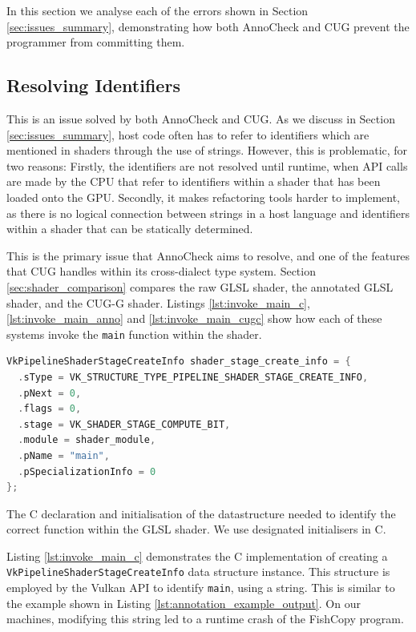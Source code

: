 \documentclass[a4paper,12pt,twoside,openright]{report}
\begin{document}
In this section we analyse each of the errors shown in Section
\ref{sec:issues_summary}, demonstrating how both AnnoCheck and CUG prevent the
programmer from committing them.

\subsection{Resolving Identifiers}

\label{sec:resolving_identifiers}

This is an issue solved by both AnnoCheck and CUG. As we discuss in Section
\ref{sec:issues_summary}, host code often has to refer to identifiers which are
mentioned in shaders through the use of strings. However, this is problematic,
for two reasons: Firstly, the identifiers are not resolved until runtime, when
API calls are made by the CPU that refer to identifiers within a shader that
has been loaded onto the GPU. Secondly, it makes refactoring tools harder to
implement, as there is no logical connection between strings in a host language
and identifiers within a shader that can be statically determined.

This is the primary issue that AnnoCheck aims to resolve, and one of the
features that CUG handles within its cross-dialect type system. Section
\ref{sec:shader_comparison} compares the raw GLSL shader, the annotated GLSL
shader, and the CUG-G shader. Listings \ref{lst:invoke_main_c},
\ref{lst:invoke_main_anno} and \ref{lst:invoke_main_cugc} show how each of
these systems invoke the \texttt{main} function within the shader.

\begin{lstfloat}
\begin{lstlisting}[language=C]
VkPipelineShaderStageCreateInfo shader_stage_create_info = {
  .sType = VK_STRUCTURE_TYPE_PIPELINE_SHADER_STAGE_CREATE_INFO,
  .pNext = 0,
  .flags = 0,
  .stage = VK_SHADER_STAGE_COMPUTE_BIT,
  .module = shader_module,
  .pName = "main",
  .pSpecializationInfo = 0
};
\end{lstlisting}
\caption{The C declaration and initialisation of the datastructure needed to
identify the correct function within the GLSL shader. We use designated initialisers
in C\cite{DesignatedInitC}.}
\label{lst:invoke_main_c}
\end{lstfloat}

Listing \ref{lst:invoke_main_c} demonstrates the C implementation of creating a
\texttt{VkPipelineShaderStageCreateInfo} data structure instance. This
structure is employed by the Vulkan API to identify \texttt{main}, using a
string. This is similar to the example shown in Listing
\ref{lst:annotation_example_output}. On our machines, modifying this string led
to a runtime crash of the FishCopy program.
\end{document}
